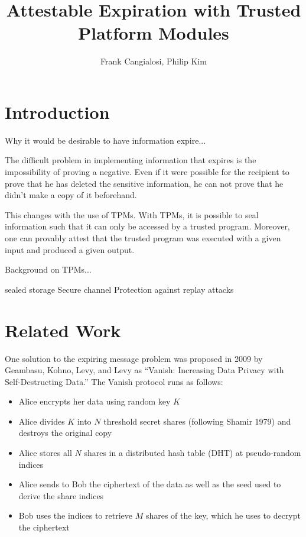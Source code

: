 \documentclass{article}
\begin{document}
\title{Attestable Expiration with Trusted Platform Modules}
\author{Frank Cangialosi, Philip Kim}

\maketitle

\section{Introduction}

Why it would be desirable to have information expire...

The difficult problem in implementing information that expires is the impossibility of proving a negative. Even if it were possible for the recipient to prove that he has deleted the sensitive information, he can not prove that he didn't make a copy of it beforehand.

This changes with the use of TPMs. With TPMs, it is possible to seal information such that it can only be accessed by a trusted program. Moreover, one can provably attest that the trusted program was executed with a given input and produced a given output.

Background on TPMs...

sealed storage
Secure channel
Protection against replay attacks


\section{Related Work}

One solution to the expiring message problem was proposed in 2009 by Geambasu, Kohno, Levy, and Levy as ``Vanish: Increasing Data Privacy with Self-Destructing Data.'' The Vanish protocol runs as follows: 

\begin{itemize}
\item Alice encrypts her data using random key $K$
\item Alice divides $K$ into $N$ threshold secret shares (following Shamir 1979) and destroys the original copy 
\item Alice stores all $N$ shares in a distributed hash table (DHT) at pseudo-random indices
\item Alice sends to Bob the ciphertext of the data as well as the seed used to derive the share indices
\item Bob uses the indices to retrieve $M$ shares of the key, which he uses to decrypt the ciphertext
\end{itemize}
\end{document}
